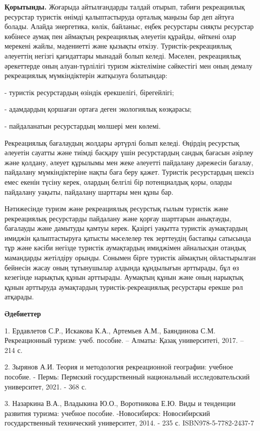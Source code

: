 {\bfseries Қорытынды.} Жоғарыда айтылғандарды талдай отырып, табиғи
рекреациялық ресурстар туристік өнімді қалыптастыруда орталық маңызы бар
деп айтуға болады. Алайда энергетика, көлік, байланыс, еңбек ресурстары
сияқты ресурстар көбінесе аумақ пен аймақтың рекреациялық әлеуетін
құрайды, өйткені олар мерекені жайлы, мәдениетті және қызықты өткізу.
Туристік-рекреациялық әлеуеттің негізгі қағидаттары мынадай болып
келеді. Мәселен, рекреациялық әрекеттерде оның алуан-түрлілігі туризм
жіктеліміне сәйкестігі мен оның демалу рекреациялық мүмкіндіктерін
жатқызуға болатындар:

- туристік ресурстардың өзіндік ерекшелігі, бірегейлігі;

- адамдардың қоршаған ортаға деген экологиялық көзқарасы;

- пайдаланатын ресурстардың мөлшері мен көлемі.

Рекреациялық бағалаудың жолдары әртүрлі болып келеді. Өңірдің ресурстық
әлеуетін сауатты және тиімді басқару үшін ресурстардың сандық бағасын
әзірлеу және қолдану, әлеует құрылымы мен жеке әлеуетті пайдалану
дәрежесін бағалау, пайдалану мүмкіндіктеріне нақты баға беру қажет.
Туристік ресурстардың шексіз емес екенін түсіну керек, олардың белгілі
бір потенциалдық қоры, оларды пайдалану уақыты, пайдалану шарттары мен
құны бар.

Нәтижесінде туризм және рекреациялық ресурстық ғылым туристік және
рекреациялық ресурстарды пайдалану және қорғау шарттарын анықтауды,
бағалауды және дамытуды қамтуы керек. Қазіргі уақытта туристік
аумақтардың имиджін қалыптастыруға қатысты мәселелер тек зерттеудің
бастапқы сатысында тұр және кәсіби негізде туристік аумақтардың
имиджімен айналысқан отандық мамандарды жетілдіру орынды. Сонымен бірге
туристік аймақтың ойластырылған бейнесін жасау оның тұтынушылар алдында
құндылығын арттырады, бұл өз кезегінде нарықтық құнын арттырады.
Аумақтың құнын және оның нарықтық құнын арттыруда аумақтардың
туристік-рекреациялық ресурстары ерекше рөл атқарады.

{\bfseries Әдебиеттер}

1. Ердавлетов С.Р., Искакова К.А., Артемьев А.М., Баяндинова С.М.
Рекреационный туризм: учеб. пособие. -- Алматы: Қазақ университеті,
2017. -- 214 с.

2. Зырянов А.И. Теория и методология рекреационной географии: учебное
пособие. - Пермь: Пермский государственный национальный
исследовательский университет, 2021. - 368 с.

3. Назаркина В.А., Владыкина Ю.О., Воротникова Е.Ю. Виды и тенденции
развития туризма: учебное пособие. -Новосибирск: Новосибирский
государственный технический университет, 2014. - 235 с.
ISBN978-5-7782-2437-7

